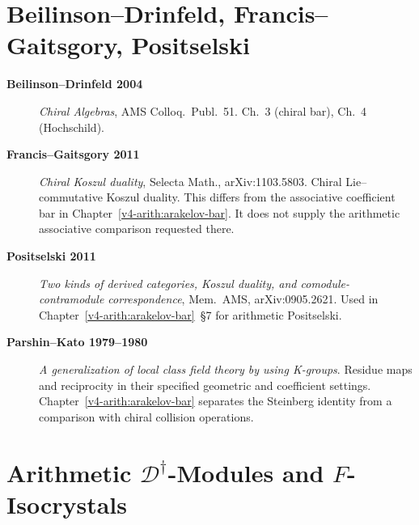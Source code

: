 \section{Beilinson--Drinfeld, Francis--Gaitsgory, Positselski}
\label{v4-arith:app:A:beilinson-etc}

\begin{description}
\item[\textbf{Beilinson--Drinfeld 2004}] \emph{Chiral Algebras},
AMS Colloq.~Publ.~51. Ch.~3 (chiral bar), Ch.~4 (Hochschild).
\item[\textbf{Francis--Gaitsgory 2011}] \emph{Chiral Koszul
duality}, Selecta Math., arXiv:1103.5803. Chiral Lie--commutative
Koszul duality. This differs from the associative coefficient bar in
Chapter~\ref{v4-arith:arakelov-bar}. It does not supply the arithmetic
associative comparison requested there.
\item[\textbf{Positselski 2011}] \emph{Two kinds of derived
categories, Koszul duality, and comodule-contramodule
correspondence}, Mem.~AMS, arXiv:0905.2621. Used in
Chapter~\ref{v4-arith:arakelov-bar}~\S7 for arithmetic Positselski.
\item[\textbf{Parshin--Kato 1979--1980}] \emph{A generalization of
local class field theory by using K-groups}. Residue maps and
reciprocity in their specified geometric and coefficient settings.
Chapter~\ref{v4-arith:arakelov-bar} separates the Steinberg identity
from a comparison with chiral collision operations.
\end{description}

\section{Arithmetic \(\mathcal{D}^{\dagger}\)-Modules and \(F\)-Isocrystals}
\label{v4-arith:app:A:arith-Ddagger}

